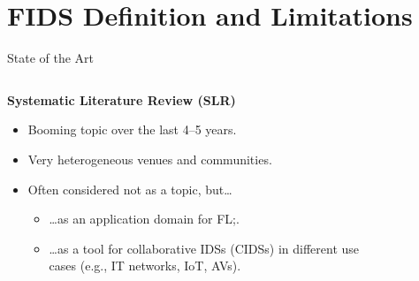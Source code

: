 \section{FIDS Definition and Limitations}

\begin{frame}
  \sectionpage

\end{frame}


\begin{frame}{State of the Art}

  \begin{columns}
    \begin{column}{0.5\textwidth}

      \textbf{Systematic Literature Review (SLR)}~\autocite{lavaur_tnsm_2022}
      \begin{itemize}
        \item Booming topic over the last 4--5 years.
        \item<2-> Very heterogeneous venues and communities.
        \item<3-> Often considered not as a topic, but\dots
        \begin{itemize}
          \item \dots{}as an application domain for FL;.
          \item \dots{}as a tool for collaborative IDSs (CIDSs) in different use cases (e.g., IT networks, IoT, AVs).
        \end{itemize}
      \end{itemize}
      
    \end{column}

    \begin{column}{0.5\textwidth}
      \begin{figure}
        \centering
      \end{figure}
    \end{column}
      
  \end{columns}


\end{frame}

